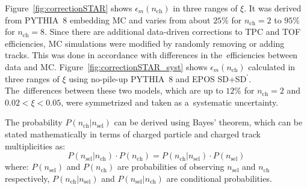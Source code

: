 Figure~\ref{fig:correctionSTAR} shows $\epsilon_{m}(n_\textrm{ch})$  in three ranges of $\xi$. It was derived from PYTHIA~8 embedding MC and varies from about $25\%$ for $n_\textrm{ch}=2$ to $95\%$ for $n_\textrm{ch}=8$. Since there are additional data-driven corrections to \ac{TPC} and TOF efficiencies,  MC simulations were modified by randomly removing or adding tracks. This was done in accordance with differences in the~efficiencies between data and MC. 
Figure~\ref{fig:correctionSTAR_syst} shows  $\epsilon_{m}(n_\textrm{ch})$ calculated in three ranges of $\xi$ using no-pile-up PYTHIA~8 and EPOS SD+SD$^\prime$. The~differences between
these two models, which are up to $12\%$ for $n_\textrm{ch}=2$ and $0.02<\xi<0.05$, were symmetrized and taken as a~systematic uncertainty.



\noindent The  probability $P(n_\textrm{ch}|n_\textrm{sel})$ can be derived using Bayes' theorem, which can be stated mathematically in terms of charged particle and charged track multiplicities as:
\begin{equation}
P\left(n_\textrm{sel}|n_\textrm{ch}\right)\cdot P\left(n_\textrm{ch}\right) = P\left(n_\textrm{ch}|n_\textrm{sel}\right)\cdot P\left(n_\textrm{sel}\right)
\end{equation}
where: $P(n_\textrm{sel})$ and $P(n_\textrm{ch})$ are probabilities of observing $n_\textrm{sel}$ and $n_\textrm{ch}$ respectively, $P(n_\textrm{ch}|n_\textrm{sel})$ and $P(n_\textrm{sel}|n_\textrm{ch})$ are conditional probabilities.

